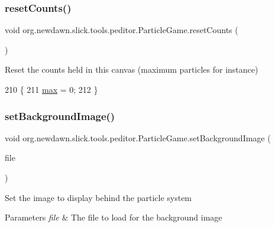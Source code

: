 \subsubsection{\texorpdfstring{reset\+Counts()}{resetCounts()}}
{\footnotesize\ttfamily void org.\+newdawn.\+slick.\+tools.\+peditor.\+Particle\+Game.\+reset\+Counts (\begin{DoxyParamCaption}{ }\end{DoxyParamCaption})\hspace{0.3cm}{\ttfamily [inline]}}

Reset the counts held in this canvas (maximum particles for instance) 
\begin{DoxyCode}
210                               \{
211         \mbox{\hyperlink{classorg_1_1newdawn_1_1slick_1_1tools_1_1peditor_1_1_particle_game_adc975d825375ac80ddd460f0797def3c}{max}} = 0;
212     \}
\end{DoxyCode}
\mbox{\label{classorg_1_1newdawn_1_1slick_1_1tools_1_1peditor_1_1_particle_game_a081aedf0b9add8b9ef26cc2d19da7176}} 
\subsubsection{\texorpdfstring{set\+Background\+Image()}{setBackgroundImage()}}
{\footnotesize\ttfamily void org.\+newdawn.\+slick.\+tools.\+peditor.\+Particle\+Game.\+set\+Background\+Image (\begin{DoxyParamCaption}\item[{File}]{file }\end{DoxyParamCaption})\hspace{0.3cm}{\ttfamily [inline]}}

Set the image to display behind the particle system


\begin{DoxyParams}{Parameters}
{\em file} & The file to load for the background image \\
\hline
\end{DoxyParams}

